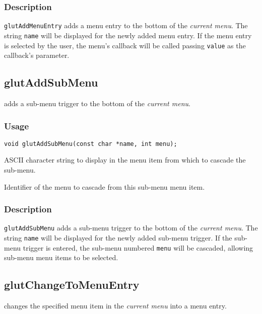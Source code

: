 \subsubsection*{Description}

{\tt glutAddMenuEntry} adds a menu entry to the bottom of the {\em current menu}.
The string {\tt name} will be displayed for the newly added menu entry.
If the menu entry is selected by the user, the menu's callback will be called
passing {\tt value} as the callback's parameter.

\subsection{glutAddSubMenu}

 adds a sub-menu trigger to the bottom of the {\em current menu}.

\subsubsection*{Usage}
\begin{verbatim}
void glutAddSubMenu(const char *name, int menu);
\end{verbatim}
\begin{description}
\itemsep 0in
\item[{\tt name}]
ASCII character string to display in the menu item from which to cascade the sub-menu.
\item[{\tt menu}]
Identifier of the menu to cascade from this sub-menu menu item.
\end{description}

\subsubsection*{Description}

{\tt glutAddSubMenu} adds a sub-menu trigger to the bottom of the {\em current menu}.
The string {\tt name} will be displayed for the newly added sub-menu trigger.
If the sub-menu trigger is entered, the sub-menu numbered {\tt menu} will
be cascaded, allowing sub-menu menu items to be selected.

\subsection{glutChangeToMenuEntry}

 changes the specified menu item in the {\em current
menu} into a menu entry.

